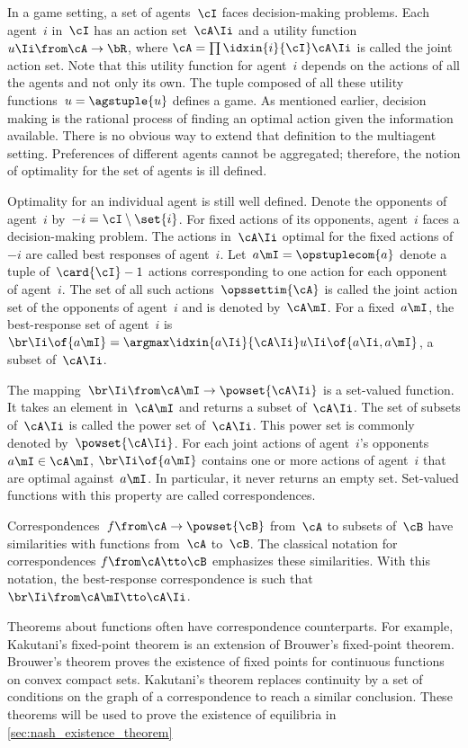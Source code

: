 In a game setting, a set of agents~\(\cI\) faces decision-making problems.
Each agent~\(i\) in~\(\cI\) has an action set~\(\cA\Ii\) and a utility function~\(u\Ii \from \cA \to \bR\), where \(\cA = \prod \idxin{i}{\cI} \cA\Ii\) is called the joint action set.
Note that this utility function for agent~\(i\) depends on the actions of all the agents and not only its own.
The tuple composed of all these utility functions~\(u = \agstuple{u}\) defines a game.
As mentioned earlier, decision making is the rational process of finding an optimal action given the information available.
There is no obvious way to extend that definition to the multiagent setting.
Preferences of different agents cannot be aggregated; therefore, the notion of optimality for the set of agents is ill defined.

Optimality for an individual agent is still well defined.
Denote the opponents of agent~\(i\) by~\(-i = \cI \setminus \set{i}\).
For fixed actions of its opponents, agent~\(i\) faces a decision-making problem.
The actions in~\(\cA\Ii\) optimal for the fixed actions of~\(-i\) are called best responses of agent~\(i\).
Let~\(a\mI = \opstuplecom{a}\) denote a tuple of~\(\card{\cI} - 1\) actions corresponding to one action for each opponent of agent~\(i\).
The set of all such actions~\(\opssettim{\cA}\) is called the joint action set of the opponents of agent~\(i\) and is denoted by~\(\cA\mI\).
For a fixed~\(a\mI\), the best-response set of agent~\(i\) is~\(\br\Ii \of {a\mI} = \argmax\idxin{a\Ii}{\cA\Ii} u\Ii \of {a\Ii, a\mI}\), a subset of~\(\cA\Ii\).

\begin{note}
The mapping~\(\br\Ii \from \cA\mI \to \powset{\cA\Ii}\) is a set-valued function.
It takes an element in~\(\cA\mI\) and returns a subset of~\(\cA\Ii\).
The set of subsets of~\(\cA\Ii\) is called the power set of~\(\cA\Ii\).
This power set is commonly denoted by~\(\powset{\cA\Ii}\).
For each joint actions of agent~\(i\)'s opponents~\(a\mI \in \cA\mI\), \(\br\Ii \of {a\mI}\) contains one or more actions of agent~\(i\) that are optimal against~\(a\mI\).
In particular, it never returns an empty set.
Set-valued functions with this property are called correspondences.

Correspondences~\(f \from \cA \to \powset{\cB}\) from~\(\cA\) to subsets of~\(\cB\) have similarities with functions from~\(\cA\) to~\(\cB\).
The classical notation for correspondences \(f \from \cA \tto \cB\) emphasizes these similarities.
With this notation, the best-response correspondence is such that~\(\br\Ii \from \cA\mI \tto \cA\Ii\).

Theorems about functions often have correspondence counterparts.
For example, Kakutani's fixed-point theorem is an extension of Brouwer's fixed-point theorem.
Brouwer's theorem proves the existence of fixed points for continuous functions on convex compact sets.
Kakutani's theorem replaces continuity by a set of conditions on the graph of a correspondence to reach a similar conclusion.
These theorems will be used to prove the existence of equilibria in \cref{sec:nash_existence_theorem}
\end{note}

